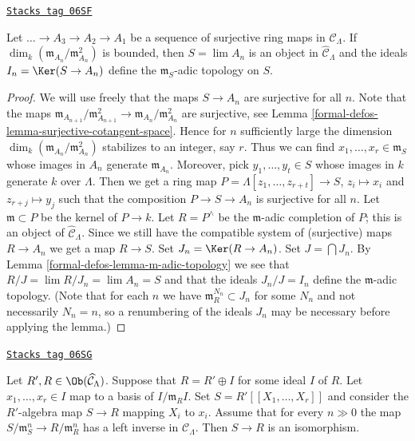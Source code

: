 \begin{lemma}
\label{formal-defos-lemma-limit-artinian}
\href{https://stacks.math.columbia.edu/tag/06SF}{\texttt{Stacks tag 06SF}}

Let $\ldots \to A_3 \to A_2 \to A_1$ be a sequence of surjective
ring maps in $\mathcal{C}_\Lambda$. If
$\dim_k (\mathfrak m_{A_n}/\mathfrak m_{A_n}^2)$ is bounded, then
$S = \lim A_n$ is an object in $\widehat{\mathcal{C}}_\Lambda$
and the ideals $I_n = \Ker(S \to A_n)$ define the
$\mathfrak m_S$-adic topology on $S$.
\end{lemma}

\begin{proof}
We will use freely that the maps $S \to A_n$ are surjective for all $n$.
Note that the maps
$\mathfrak m_{A_{n + 1}}/\mathfrak m_{A_{n + 1}}^2 \to
\mathfrak m_{A_n}/\mathfrak m_{A_n}^2$ are surjective, see
Lemma \ref{formal-defos-lemma-surjective-cotangent-space}.
Hence for $n$ sufficiently large the dimension
$\dim_k (\mathfrak m_{A_n}/\mathfrak m_{A_n}^2)$ stabilizes to an
integer, say $r$.
Thus we can find $x_1, \ldots, x_r \in \mathfrak m_S$ whose images in
$A_n$ generate $\mathfrak m_{A_n}$. Moreover, pick $y_1, \ldots, y_t \in S$
whose images in $k$ generate $k$ over $\Lambda$. Then we get a ring map
$P = \Lambda[z_1, \ldots, z_{r + t}] \to S$, $z_i \mapsto x_i$ and
$z_{r + j} \mapsto y_j$ such that the composition
$P \to S \to A_n$ is surjective for all $n$. Let $\mathfrak m \subset P$
be the kernel of $P \to k$. Let $R = P^\wedge$ be the $\mathfrak m$-adic
completion of $P$; this is an object of $\widehat{\mathcal{C}}_\Lambda$.
Since we still have the compatible system of (surjective) maps $R \to A_n$
we get a map $R \to S$. Set $J_n = \Ker(R \to A_n)$.
Set $J = \bigcap J_n$. By
Lemma \ref{formal-defos-lemma-m-adic-topology}
we see that $R/J = \lim R/J_n = \lim A_n = S$
and that the ideals $J_n/J = I_n$ define the $\mathfrak m$-adic topology.
(Note that for each $n$ we have $\mathfrak m_R^{N_n} \subset J_n$ for
some $N_n$ and not necessarily $N_n = n$, so a renumbering of the ideals
$J_n$ may be necessary before applying the lemma.)
\end{proof}

\begin{lemma}
\label{formal-defos-lemma-power-series}
\href{https://stacks.math.columbia.edu/tag/06SG}{\texttt{Stacks tag 06SG}}

Let $R', R \in \Ob(\widehat{\mathcal{C}}_\Lambda)$. Suppose that
$R = R' \oplus I$ for some ideal $I$ of $R$. Let $x_1, \ldots, x_r \in I$
map to a basis of $I/\mathfrak m_R I$. Set $S = R'[[X_1, \ldots, X_r]]$
and consider the $R'$-algebra map $S \to R$ mapping $X_i$ to $x_i$.
Assume that for every $n \gg 0$ the map
$S/\mathfrak m_S^n \to R/\mathfrak m_R^n$ has a left inverse in
$\mathcal{C}_\Lambda$. Then $S \to R$ is an isomorphism.
\end{lemma}

